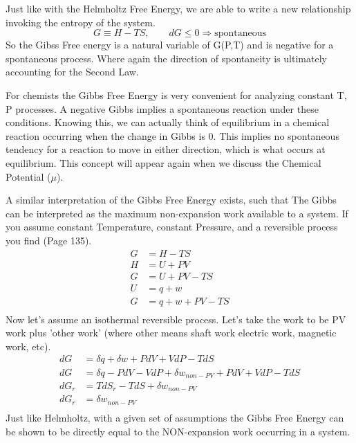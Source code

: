 \documentclass{article}
\newcommand{\be}{\begin{equation}}
\newcommand{\ee}{\end{equation}}
\begin{document}
Just like with the Helmholtz Free Energy, we are able to write a new relationship invoking the entropy of the system.
\begin{equation}
    G \equiv H - TS ,\qquad dG \leq 0 \Rightarrow \text{spontaneous}
\end{equation}
So the Gibss Free energy is a natural variable of G(P,T) and is negative for a spontaneous process. 
Where again the direction of spontaneity is ultimately accounting for the Second Law. 

For chemists the Gibbs Free Energy is very convenient for analyzing constant T, P processes. 
A negative Gibbs implies a spontaneous reaction under these conditions. 
Knowing this, we can actually think of equilibrium in a chemical reaction occurring when the change in Gibbs is 0. 
This implies no spontaneous tendency for a reaction to move in either direction, which is what occurs at equilibrium.
This concept will appear again when we discuss the Chemical Potential ($\mu$).

A similar interpretation of the Gibbs Free Energy exists, such that The Gibbs can be interpreted as the maximum non-expansion work available to a system. 
If you assume constant Temperature, constant Pressure, and a reversible process you find (Page 135).
\be
\begin{split}
G &= H - TS\\
H &= U + PV \\
G &= U + PV - TS\\
U &= q + w \\
G &= q + w + PV - TS\\
\end{split}
\ee
Now let's assume an isothermal reversible process.
Let's take the work to be PV work plus 'other work' (where other means shaft work electric work, magnetic work, etc).
\be
\begin{split}
dG &= \delta q + \delta w + PdV + VdP - TdS\\
dG &= \delta q -PdV - VdP + \delta w_{non-PV}+ PdV + VdP - TdS\\
dG_r &= TdS_r -TdS + \delta w_{non-PV} \\
dG_r &= \delta w_{non-PV}\\
\end{split}
\ee
Just like Helmholtz, with a given set of assumptions the Gibbs Free Energy can be shown to be directly equal to the NON-expansion work occurring in a system. 
\end{document}

